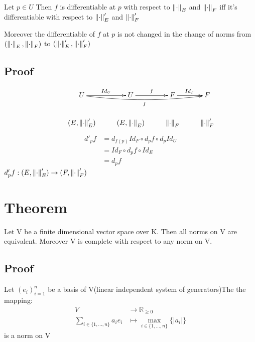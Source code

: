 \documentclass{book}
\newcommand{\abs}[1]{\left\lvert #1 \right\rvert}
\begin{document}
Let $p\in U$ Then $f$ is differentiable at $p$ with respect to $\left\lVert \cdot \right\rVert_E$ and $\left\lVert \cdot \right\rVert_F$ iff it's differentiable with respect to $\left\lVert \cdot \right\rVert'_E$ and $\left\lVert \cdot \right\rVert'_F$ 

Moreover the differentiable of $f$ at $p$ is not changed in the change of norms from $(\left\lVert \cdot \right\rVert_E,\left\lVert \cdot \right\rVert_F)$ to $(\left\lVert \cdot \right\rVert'_E,\left\lVert \cdot \right\rVert'_F)$
\subsection*{Proof}
$$\xymatrix{
    & U\ar[r]^{Id_U}\ar@/_/[rrr]_f &U\ar[r]^f &F\ar[r]^{Id_F} &F\\
    & (E,\norm{\cdot}'_E) &(E,\norm{\cdot}_E) &\norm{\cdot}_F &\norm{\cdot}'_F
}$$
$$\begin{aligned}
    d'_pf &= d_{f(p)}Id_F\circ d_pf\circ d_pId_U\\
    &= Id_F\circ d_p f\circ Id_E\\
    &= d_p f
\end{aligned}$$ $d'_pf: (E,\left\lVert \cdot \right\rVert'_E)\rightarrow(F,\left\lVert \cdot \right\rVert'_F)$
\section{Theorem}
Let V be  a finite dimensional vector space over K. Then all norms on V are equivalent. Moreover V is complete with respect to any norm on V.
\subsection*{Proof}
Let $(e_i)_{i=1}^n$ be  a basis of V(linear independent system of generators)The the mapping:$$\begin{aligned}
    V &\rightarrow \mathbb{R}_{\geq 0}\\
    \sum\limits_{i\in \{1,...,n\}}a_ie_i &\mapsto \max\limits_{i\in \{1,...,n\}}\{\abs{a_i}\}
\end{aligned}$$is a norm on V
\end{document}
